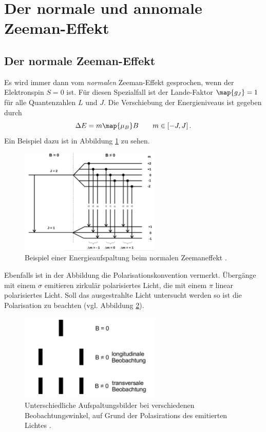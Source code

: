 \section{Der normale und annomale Zeeman-Effekt}

\subsection{Der normale Zeeman-Effekt}
Es wird immer dann vom \emph{normalen} Zeeman-Effekt gesprochen, wenn der Elektronspin $S=0$ ist.
Für diesen Spezialfall ist der Lande-Faktor $\map{g_J}=1$ für alle Quantenzahlen $L$ und $J$.
Die Verschiebung der Energieniveaus ist gegeben durch
\begin{equation}
  \label{eq: energie_normaler_zeeman}
  \Delta E=m\map{\mu_B}B \qquad m\in\left[-J,J\right].
\end{equation}
Ein Beispiel dazu ist in Abbildung \ref{fig: energie_normaler_zeeman} zu sehen.
\FloatBarrier
\begin{figure}[h]
  \centering
  \includegraphics[width=0.6\textwidth]{pics/enerieaufspaltung_normaler_zeeman.png}
  \caption{Beispiel einer Energieaufspaltung beim normalen Zeemaneffekt \cite{anleitung27}.}
  \label{fig: energie_normaler_zeeman}
\end{figure}
\FloatBarrier
Ebenfalls ist in der Abbildung die Polarisationskonvention vermerkt.
Übergänge mit einem $\sigma$ emitieren zirkulär polarisiertes Licht, die mit einem
$\pi$ linear polarisiertes Licht. Soll das ausgestrahlte Licht untersucht werden so ist die Polarisation zu beachten (vgl. Abbildung \ref{fig: beobachtung_energie}).
\FloatBarrier
\begin{figure}[h]
  \centering
  \includegraphics[width=0.6\textwidth]{pics/beobachtung_energie.png}
  \caption{Unterschiedliche Aufspaltungsbilder bei verschiedenen Beobachtungswinkel, auf Grund der Polasirations des emitierten Lichtes \cite{anleitung27}.}
  \label{fig: beobachtung_energie}
\end{figure}
\FloatBarrier

